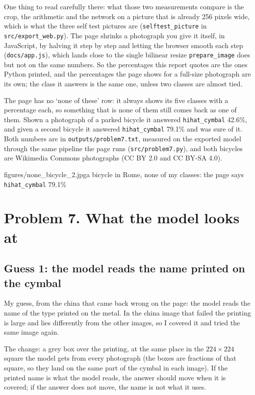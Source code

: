 \documentclass[11pt]{article}
\begin{document}
One thing to read carefully there: what those two measurements compare is the
crop, the arithmetic and the network on a picture that is already 256 pixels
wide, which is what the three self test pictures are (\texttt{selftest\_picture}
in \texttt{src/export\_web.py}). The page shrinks a photograph you give it
itself, in JavaScript, by halving it step by step and letting the browser smooth
each step (\texttt{docs/app.js}), which lands close to the single bilinear
resize \texttt{prepare\_image} does but not on the same numbers. So the
percentages this report quotes are the ones Python printed, and the percentages
the page shows for a full-size photograph are its own; the class it answers is
the same one, unless two classes are almost tied.

The page has no `none of these' row: it always shows its five classes with a
percentage each, so something that is none of them still comes back as one of
them. Shown a photograph of a parked bicycle it answered \texttt{hihat\_cymbal}
42.6\%, and given a second bicycle it answered \texttt{hihat\_cymbal} 79.1\% and
was sure of it. Both numbers are in \texttt{outputs/problem7.txt}, measured on
the exported model through the same pipeline the page runs
(\texttt{src/problem7.py}), and both bicycles are Wikimedia Commons photographs
(CC BY 2.0 and CC BY-SA 4.0).

{figures/none_bicycle_2.jpg}{a bicycle in Rome, none of my classes: the page
says \texttt{hihat\_cymbal} 79.1\%}

\section*{Problem 7. What the model looks at}

\subsection*{Guess 1: the model reads the name printed on the cymbal}

My guess, from the china that came back wrong on the page: the model reads the
name of the type printed on the metal. In the china image that failed the
printing is large and lies differently from the other images, so I covered it
and tried the same image again.

The change: a grey box over the printing, at the same place in the $224 \times
224$ square the model gets from every photograph (the boxes are fractions of
that square, so they land on the same part of the cymbal in each image). If the
printed name is what the model reads, the answer should move when it is covered;
if the answer does not move, the name is not what it uses.
\end{document}
